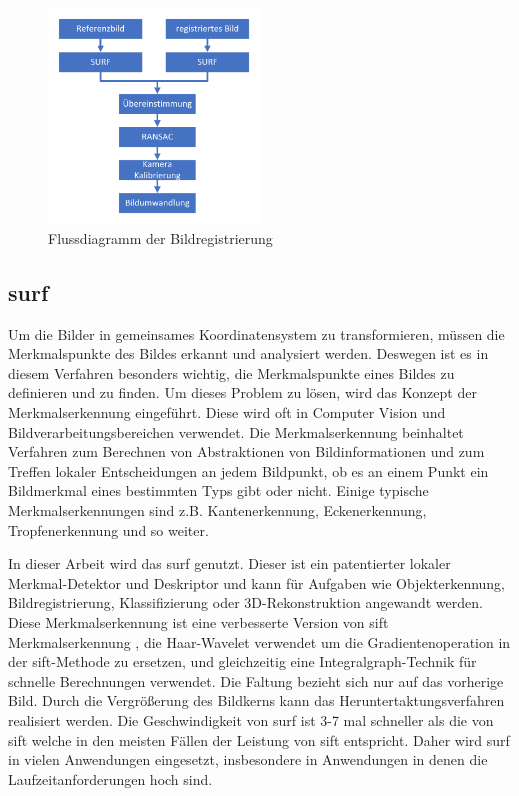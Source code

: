 \begin{figure}[H]
 \centering 
 \includegraphics[keepaspectratio,width=0.5\textwidth]{images/3_Ersteverfahren/Bildregistration.pdf}
 \caption{Flussdiagramm der Bildregistrierung}
 \label{fig:Bildregistrierung}
\end{figure}

\subsection{\gls{surf}}
Um die Bilder in gemeinsames Koordinatensystem zu transformieren, müssen die Merkmalspunkte des Bildes erkannt und analysiert werden. Deswegen ist es in diesem Verfahren besonders wichtig, die Merkmalspunkte eines Bildes zu definieren und zu finden. Um dieses Problem zu lösen, wird das Konzept der Merkmalserkennung eingeführt. Diese wird oft in Computer Vision und Bildverarbeitungsbereichen verwendet. Die Merkmalserkennung beinhaltet Verfahren zum Berechnen von Abstraktionen von Bildinformationen und zum Treffen lokaler Entscheidungen an jedem Bildpunkt, ob es an einem Punkt ein Bildmerkmal eines bestimmten Typs gibt oder nicht. Einige typische Merkmalserkennungen sind z.B. Kantenerkennung, Eckenerkennung, Tropfenerkennung und so weiter.

In dieser Arbeit wird das \gls{surf} \cite{Surf} genutzt. 
Dieser ist ein patentierter lokaler Merkmal-Detektor und Deskriptor und kann für Aufgaben wie Objekterkennung, Bildregistrierung, Klassifizierung oder 3D-Rekonstruktion angewandt werden. Diese Merkmalserkennung ist eine verbesserte Version von \gls{sift} Merkmalserkennung \cite{SIFT}, die Haar-Wavelet verwendet um die Gradientenoperation in der \gls{sift}-Methode zu ersetzen, und gleichzeitig eine Integralgraph-Technik für schnelle Berechnungen verwendet. Die Faltung bezieht sich nur auf das vorherige Bild. Durch die Vergrößerung des Bildkerns kann das Heruntertaktungsverfahren realisiert werden. Die Geschwindigkeit von \gls{surf} ist 3-7 mal schneller als die von \gls{sift} welche in den meisten Fällen der Leistung von \gls{sift} entspricht. Daher wird \gls{surf} in vielen Anwendungen eingesetzt, insbesondere in Anwendungen in denen die Laufzeitanforderungen hoch sind. 

